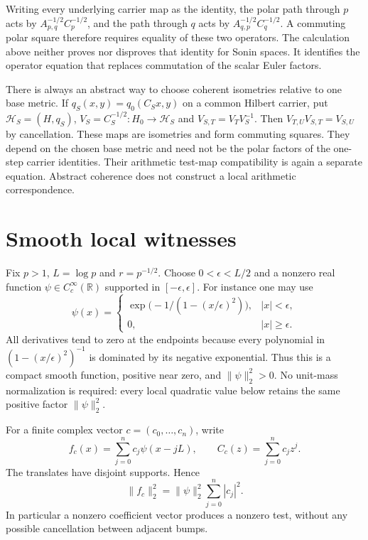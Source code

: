 \documentclass[11pt,letterpaper]{article}
\theoremstyle{definition}
\theoremstyle{remark}
\newcommand{\R}{\mathbb R}
\begin{document}
Writing every underlying carrier map as the identity, the
polar path through $p$ acts by
$A_{p,q}^{-1/2}C_p^{-1/2}$, and the path through $q$ acts by
$A_{q,p}^{-1/2}C_q^{-1/2}$. A commuting polar square therefore
requires equality of these two operators. The calculation
above neither proves nor disproves that identity for Sonin
spaces. It identifies the operator equation that replaces
commutation of the scalar Euler factors.

There is always an abstract way to choose coherent isometries
relative to one base metric. If $q_S(x,y)=q_0(C_Sx,y)$ on a
common Hilbert carrier, put $\mathcal H_S=(H,q_S)$,
$V_S=C_S^{-1/2}:H_0\to\mathcal H_S$ and
$V_{S,T}=V_TV_S^{-1}$. Then
$V_{T,U}V_{S,T}=V_{S,U}$ by cancellation. These maps are
isometries and form commuting squares. They depend on the
chosen base metric and need not be the polar factors of the
one-step carrier identities. Their arithmetic test-map
compatibility is again a separate equation. Abstract coherence
does not construct a local arithmetic correspondence.

\section{Smooth local witnesses}
\label{sec:bumps}

Fix $p>1$, $L=\log p$ and $r=p^{-1/2}$. Choose
$0<\epsilon<L/2$ and a nonzero real function
$\psi\in C_c^\infty(\R)$ supported in $[-\epsilon,\epsilon]$.
For instance one may use
\begin{equation}
 \psi(x)=
 \begin{cases}
 \exp\bigl(-1/(1-(x/\epsilon)^2)\bigr),&|x|<\epsilon,\\
 0,&|x|\geq\epsilon.
 \end{cases}
 \label{eq:explicit-bump}
\end{equation}
All derivatives tend to zero at the endpoints because every
polynomial in $(1-(x/\epsilon)^2)^{-1}$ is dominated by its
negative exponential. Thus this is a compact smooth function,
positive near zero, and $\|\psi\|_2^2>0$.
No unit-mass normalization is required: every local quadratic
value below retains the same positive factor $\|\psi\|_2^2$.

For a finite complex vector $c=(c_0,\ldots,c_n)$, write
\begin{equation}
 f_c(x)=\sum_{j=0}^nc_j\psi(x-jL),\qquad
 C_c(z)=\sum_{j=0}^nc_jz^j.
 \label{eq:bump-packet}
\end{equation}
The translates have disjoint supports. Hence
\begin{equation}
 \|f_c\|_2^2=\|\psi\|_2^2\sum_{j=0}^n|c_j|^2.
 \label{eq:packet-norm}
\end{equation}
In particular a nonzero coefficient vector produces a nonzero
test, without any possible cancellation between adjacent bumps.
\end{document}
